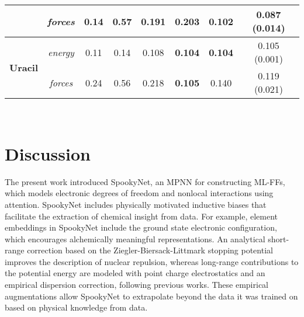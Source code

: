 \documentclass[%
superscriptaddress,
reprint,
nofootinbib,
amsmath,amssymb,amsfonts,
floatfix,
altaffilletter,
showkeys,
]{revtex4-2}
\newcommand{\nn}{SpookyNet}
\begin{document}
\begin{table*}
\begin{tabular}{c c c c c c c c}
		& \it forces & 0.14 & 0.57 & 0.191 & 0.203 & 0.102 & {\bf 0.087} (0.014)\\
		\midrule
		\multirow{2}{*}{\bf Uracil} & \it energy & 0.11 & 0.14 & 0.108 & \bf 0.104 & \bf 0.104 & 0.105 (0.001)\\
		& \it forces & 0.24 & 0.56 & 0.218 & \bf 0.105 & 0.140 & 0.119 (0.021)\\
		\bottomrule
	\end{tabular}
	\caption{Mean absolute errors for energy (kcal~mol$^{-1}$) and force  (kcal~mol$^{-1}$~\AA$^{-1}$) predictions for the MD17 benchmark. Results for \nn{} are averaged over ten random splits, the standard deviation between runs is given in brackets. All models are trained on 1000 data points (separate models are used for each molecule), best results in bold.}
	\label{tab:md17_results}
\end{table*}\\



\section*{Discussion}
\label{sec:discussion}

The present work introduced \nn{}, an MPNN for constructing ML-FFs, which models electronic degrees of freedom and nonlocal interactions using attention.\cite{vaswani2017attention,choromanski2020rethinking}
\nn{} includes physically motivated inductive biases that facilitate the extraction of chemical insight from data. For example, element embeddings in \nn{} include the ground state electronic configuration, which encourages alchemically meaningful representations. An analytical short-range correction based on the Ziegler-Biersack-Littmark stopping potential\cite{ziegler1985stopping} improves the description of nuclear repulsion, whereas long-range contributions to the potential energy are modeled with point charge electrostatics and an empirical dispersion correction, following previous works.\cite{artrith2011high,morawietz2012neural,morawietz2013density,uteva2017interpolation,yao2018tensormol,unke2019physnet}
These empirical augmentations allow \nn{} to extrapolate beyond the data it was trained on based on physical knowledge from data.
\end{document}
